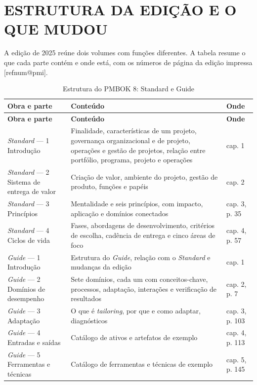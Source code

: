 \documentclass[12pt,a4paper,article,oneside,english,brazil]{abntex2}
\makeatletter
\newcommand{\fontetab}[1]{\par\vspace{3pt}{\small\noindent Fonte: #1\par}}
\newcommand{\refnum}[1]{\csname refnum@#1\endcsname}
\newcommand{\cit}[1]{[\refnum{#1}]}
\makeatother
\begin{document}
\section{ESTRUTURA DA EDIÇÃO E O QUE MUDOU}

A edição de 2025 reúne dois volumes com funções diferentes. A tabela resume o que cada parte contém e onde está, com os números de página da edição impressa [\refnum{pmi}].

\begingroup\SingleSpacing\small
\begin{longtable}{@{}>{\raggedright\arraybackslash}p{}>{\raggedright\arraybackslash}p{}>{\raggedright\arraybackslash}p{}@{}}
\caption{Estrutura do PMBOK 8: Standard e Guide}\label{tab:t1}\\
\hline
\textbf{Obra e parte} & \textbf{Conteúdo} & \textbf{Onde}\\
\hline
\endfirsthead
\hline
\textbf{Obra e parte} & \textbf{Conteúdo} & \textbf{Onde}\\
\hline
\endhead
\hline
\endfoot
\hline
\endlastfoot
\textit{Standard} — 1 Introdução & Finalidade, características de um projeto, governança organizacional e de projeto, operações e gestão de projetos, relação entre portfólio, programa, projeto e operações & cap. 1\\[3pt]
\textit{Standard} — 2 Sistema de entrega de valor & Criação de valor, ambiente do projeto, gestão de produto, funções e papéis & cap. 2\\[3pt]
\textit{Standard} — 3 Princípios & Mentalidade e seis princípios, com impacto, aplicação e domínios conectados & cap. 3, p. 35\\[3pt]
\textit{Standard} — 4 Ciclos de vida & Fases, abordagens de desenvolvimento, critérios de escolha, cadência de entrega e cinco áreas de foco & cap. 4, p. 57\\[3pt]
\textit{Guide} — 1 Introdução & Estrutura do \textit{Guide}, relação com o \textit{Standard} e mudanças da edição & cap. 1\\[3pt]
\textit{Guide} — 2 Domínios de desempenho & Sete domínios, cada um com conceitos-chave, processos, adaptação, interações e verificação de resultados & cap. 2, p. 7\\[3pt]
\textit{Guide} — 3 Adaptação & O que é \textit{tailoring}, por que e como adaptar, diagnósticos & cap. 3, p. 103\\[3pt]
\textit{Guide} — 4 Entradas e saídas & Catálogo de ativos e artefatos de exemplo & cap. 4, p. 113\\[3pt]
\textit{Guide} — 5 Ferramentas e técnicas & Catálogo de ferramentas e técnicas de exemplo & cap. 5, p. 145\\[3pt]
\end{longtable}
\endgroup
\fontetab{Elaborado pelos autores (2026), com base em \cit{pmi}.}
\end{document}
